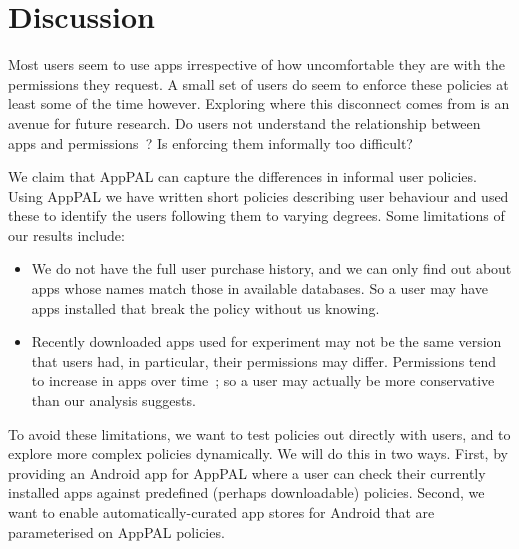 \documentclass[]{soups-poster}
\newcommand{\citep}[1]{\cite{#1}}
\begin{document}
\section{Discussion}

Most users seem to use apps irrespective of how uncomfortable they are with the permissions they request.
A small set of users do seem to enforce these policies at least some of the time however.
Exploring where this disconnect comes from is an avenue for future research.
Do users not understand the relationship between apps and permissions~\citep{Felt:2012hma}?
Is enforcing them informally too difficult?

We claim that AppPAL can capture the differences in informal user policies. %
Using AppPAL we have written short policies describing user behaviour and used these to identify the users following them to varying degrees.
Some limitations of our results include:
\begin{itemize}
\item We do not have the full user purchase history, and we can only find out about apps whose names match those in available databases.  %
  So a user may have apps installed that break the policy without us knowing.
\item Recently downloaded apps used for experiment may not be the same version that users had, in particular, their permissions may differ.
  Permissions tend to increase in apps over time~\citep{Wei:2012id}; so a user may actually be more conservative than our analysis suggests.
\end{itemize}

To avoid these limitations, we want to test policies out directly with users, and to explore more complex policies dynamically.
We will do this in two ways.
First, by providing an Android app for AppPAL where a user can check their currently installed apps against predefined (perhaps downloadable) policies.
Second, we want to enable automatically-curated app stores for Android that are parameterised on AppPAL policies.



\end{document}
